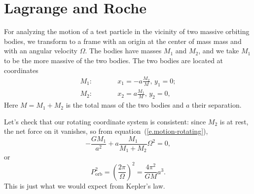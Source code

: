\section{Lagrange and Roche}
For analyzing the motion of a test particle in the vicinity of two massive orbiting bodies, we transform to a frame with an origin at the center of mass mass and with an angular velocity $\Omega$.  The bodies have masses $M_{1}$ and $M_{2}$, and we take $M_{1}$ to be the more massive of the two bodies.  The two bodies are located at coordinates
\begin{eqnarray}
	M_{1}:&\qquad& x_{1} = -a\frac{M_{2}}{M},\,y_{1} = 0;\\
	M_{2}:&\qquad& x_{2} = a\frac{M_{1}}{M},\,y_{2} = 0,
\end{eqnarray}
Here $M = M_{1}+M_{2}$ is the total mass of the two bodies and $a$ their separation.

Let's check that our rotating coordinate system is consistent: since $M_{2}$ is at rest, the net force on it vanishes, so from equation~(\ref{e.motion-rotating}),
\[ -\frac{GM_{1}}{a^{2}} + a\frac{M_{1}}{M_{1}+M_{2}}\Omega^{2} = 0, \]
or
\[ P_{\mathrm{orb}}^{2} = \left(\frac{2\pi}{\Omega}\right)^{2} = \frac{4\pi^{2}}{GM}a^{3}. \]
This is just what we would expect from Kepler's law.

